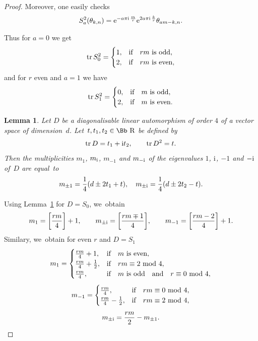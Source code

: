 \documentclass[10pt,a4paper]{amsart}
\newcommand\RR{{\mbox{\Bb R}}}
\newcommand{\tr}{\mathop{{\rm tr}}}
\numberwithin{equation}{section}
\newtheorem{Lemma}[Theorem]{Lemma}
\begin{document}
\begin{proof}
Moreover, one easily checks
\begin{gather*}
S_a^2(\theta_{k,n})={\rm e}^{-a\pi {\rm i}\,\frac{m}{r}}{\rm e}^{2a\pi {\rm i}\,\frac{k}{r}}\theta_{am-k,n}.
\end{gather*}

Thus for $a=0$ we get
\begin{gather*}
\tr S_0^2=\begin{cases}
1,&\text{if\quad $rm$ is odd},
\\
2,&\text{if\quad $rm$ is even},
\end{cases}
\end{gather*}
and for $r$ even and $a=1$ we have
\begin{gather*}
\tr S_1^2=\begin{cases}
0,&\text{if\quad $m$ is odd},
\\
2,&\text{if\quad $m$ is even}.
\end{cases}
\end{gather*}

\begin{Lemma}\label{LD4}
Let $D$ be a diagonalisable linear automorphism of order $4$ of a vector space of dimension~$d$. Let~$t, t_1, t_2\in \RR$ be defined by
\begin{gather*}
\tr D= t_1+{\rm i} t_2,\qquad \tr D^2= t.
\end{gather*}
Then the multiplicities $m_1$, $m_{\rm i}$, $m_{-1}$ and $m_{-{\rm i}}$ of the eigenvalues $1$, ${\rm i}$, $-1$ and $-{\rm i}$ of~$D$ are equal~to
\begin{gather*}
m_{\pm1}= \frac1{4}(d\pm 2t_1+t),\quad
m_{\pm {\rm i}}= \frac1{4}(d\pm 2t_2-t).
\end{gather*}
\end{Lemma}
%
Using Lemma~\ref{LD4} for $D=S_0$, we~obtain
\begin{gather*}
m_1=\bigg[\frac{rm}{4}\bigg]+1, \qquad
m_{\pm {\rm i}}=\bigg[\frac{rm\mp 1}{4}\bigg], \qquad
m_{-1}=\bigg[\frac{rm-2}{4}\bigg]+1.
\end{gather*}
Similary, we~obtain for even $r$ and $D=S_1$
\begin{gather*}
m_1=\begin{cases}
\frac{rm}{4}+1,&\text{if\quad $m$ is even},
\\
\frac{rm}{4}+\frac{1}{2},&\text{if}\quad rm\equiv 2\ {\rm mod}\ 4,
\\
\frac{rm}{4},&\text{if\quad $m$ is odd\quad and\quad $r\equiv 0\ {\rm mod}\ 4$},
\end{cases}
\\[1ex]
m_{-1}=\begin{cases}
\frac{rm}{4},&\text{if}\quad rm\equiv 0\ {\rm mod}\ 4,
\\
\frac{rm}{4}-\frac{1}{2},&\text{if}\quad rm\equiv 2\ {\rm mod}\ 4,
\end{cases}
\\[1ex]
m_{\pm {\rm i}}=\frac{rm}2-m_{\pm 1}.
\end{gather*}


\end{proof}
\end{document}
